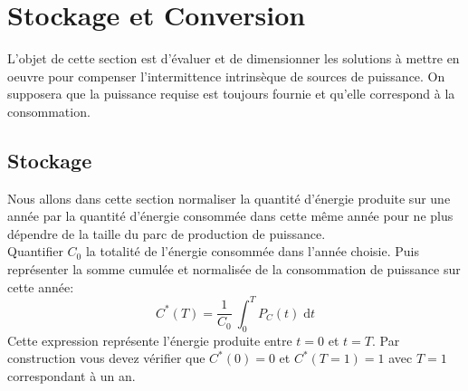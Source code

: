 \documentclass[12pt,a4,french]{article}
\begin{document}
\section{Stockage et Conversion}
L'objet de cette section est d'évaluer et de dimensionner les solutions à mettre en oeuvre pour compenser l'intermittence intrinsèque de sources de puissance. On supposera que la puissance requise est toujours fournie et qu'elle correspond à la consommation.


%	
%	
%	
%	
%	

\subsection{Stockage}
Nous allons dans cette section normaliser la quantité d'énergie produite sur une année par la quantité d'énergie consommée dans cette même année pour ne plus dépendre de la taille du parc de production de puissance. \\
Quantifier $C_0$ la totalité de l'énergie consommée dans l'année choisie. Puis  représenter la somme cumulée et normalisée de la consommation de puissance sur cette année:
\begin{equation}
	C^*(T)  = \frac{1}{C_0} ~ \int_{0}^{T}P_C(t) \; \text{d} t	
\end{equation}
Cette expression représente l'énergie produite entre $t=0$ et $t=T$. Par construction vous devez vérifier que $C^*(0)=0$ et $C^*(T=1)=1$ avec $T=1$ correspondant à un an. 
\end{document}
